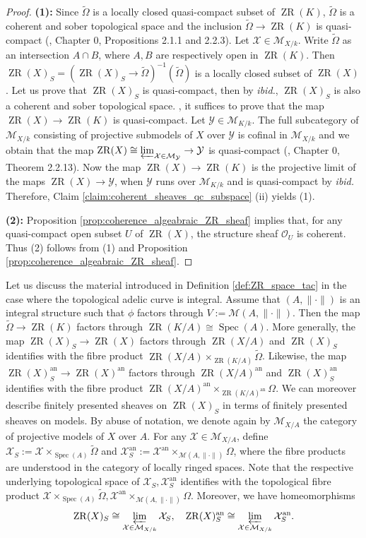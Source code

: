 \documentclass [11pt,reqno]{amsart}
\newcommand{\1}{\mathmybb{1}}
\def\cM{{\mathcal{M}}}
\def\cO{{\mathcal{O}}}
\def\cX{{\mathcal{X}}}
\def\cY{{\mathcal{Y}}}
\def\an{\operatorname{an}}
\def\Spec{\operatorname{Spec}}
\def\ZR{\operatorname{ZR}}
\def\tilde{\widetilde}
\begin{document}
\begin{proof}
\textbf{(1):} Since $\tilde{\Omega}$ is a locally closed quasi-compact subset of $\ZR(K)$, $\tilde{\Omega}$ is a coherent and sober topological space and the inclusion $\tilde{\Omega}\to\ZR(K)$ is quasi-compact (\cite{Fujiwara-Kato}, Chapter 0, Propositions 2.1.1 and 2.2.3). Let $\cX\in\cM_{X/k}$. Write $\tilde{\Omega}$ as an intersection $A\cap B$, where $A,B$ are respectively open in $\ZR(K)$. Then $\ZR(X)_{S}=(\ZR(X)_{S}\to\tilde{\Omega})^{-1}(\tilde{\Omega})$ is a locally closed subset of $\ZR(X)$. Let us prove that $\ZR(X)_{S}$ is quasi-compact, then by \emph{ibid.}, $\ZR(X)_{S}$ is also a coherent and sober topological space. , it suffices to prove that the map $\ZR(X)\to\ZR(K)$ is quasi-compact. Let $\cY\in \cM_{K/k}$. The full subcategory of $\cM_{X/k}$ consisting of projective submodels of $X$ over $\cY$ is cofinal in $\cM_{X/k}$ and we obtain that the map $\ZR(X)\cong\varprojlim_{\cX\in\cM_{\cY}}\to\cY$ is quasi-compact (\cite{Fujiwara-Kato}, Chapter 0, Theorem 2.2.13). Now the map $\ZR(X)\to\ZR(K)$ is the projective limit of the maps $\ZR(X)\to\cY$, when $\cY$ runs over $\cM_{K/k}$ and is quasi-compact by \emph{ibid.} Therefore, Claim \ref{claim:coherent_sheaves_qc_subspace} (ii) yields (1).

\textbf{(2):} Proposition \ref{prop:coherence_algeabraic_ZR_sheaf} implies that, for any quasi-compact open subset $U$ of $\ZR(X)$, the structure sheaf $\cO_{U}$ is coherent. Thus (2) follows from (1) and Proposition \ref{prop:coherence_algeabraic_ZR_sheaf}.
\end{proof}

Let us discuss the material introduced in Definition \ref{def:ZR_space_tac} in the case where the topological adelic curve is integral. Assume that $(A,\|\cdot\|)$ is an integral structure such that $\phi$ factors through $V:=\cM(A,\|\cdot\|)$. Then the map $\tilde{\Omega}\to\ZR(K)$ factors through $\ZR(K/A)\cong\Spec(A)$. More generally, the map $\ZR(X)_{S}\to \ZR(X)$ factors through $\ZR(X/A)$ and $\ZR(X)_{S}$ identifies with the fibre product $\ZR(X/A)\times_{\ZR(K/A)}\tilde{\Omega}$. Likewise, the map $\ZR(X)^{\an}_{S}\to \ZR(X)^{\an}$ factors through $\ZR(X/A)^{\an}$ and $\ZR(X)^{\an}_{S}$ identifies with the fibre product $\ZR(X/A)^{\an}\times_{\ZR(K/A)^{\an}}\Omega$. We can moreover describe finitely presented sheaves on $\ZR(X)_{S}$ in terms of finitely presented sheaves on models. By abuse of notation, we denote again by $\cM_{X/A}$ the category of projective models of $X$ over $A$. For any $\cX\in\cM_{X/A}$, define $\cX_{S}:=\cX\times_{\Spec(A)}\tilde{\Omega}$ and $\cX_{S}^{\an}:=\cX^{\an}\times_{\cM(A,\|\cdot\|)}\Omega$, where the fibre products are understood in the category of locally ringed spaces. Note that the respective underlying topological space of $\cX_{S},\cX_{S}^{\an}$ identifies with the topological fibre product $\cX\times_{\Spec(A)}\tilde{\Omega},\cX^{\an}\times_{\cM(A,\|\cdot\|)}\Omega$. Moreover, we have homeomorphisms 
\begin{align*}
\ZR(X)_{S}\cong \displaystyle\varprojlim_{\cX\in\cM_{X/k}}\cX_{S}, \quad \ZR(X)_{S}^{\an}\cong \varprojlim_{\cX\in\cM_{X/k}}\cX_{S}^{\an}.
\end{align*} 
\end{document}
